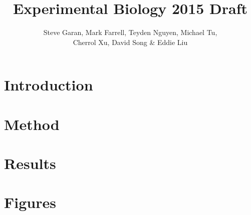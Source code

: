 \documentclass[11pt]{article}
\begin{document}
\title{Experimental Biology 2015 Draft}

\author{Steve Garan, Mark Farrell, Teyden Nguyen, Michael Tu, \\ Cherrol Xu, David Song \& Eddie Liu}

\maketitle

\section{Introduction}











\section{Method}














\section{Results}











\section{Figures}


\end{document}
